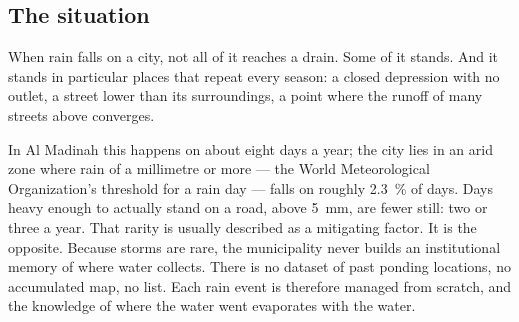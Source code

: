 \documentclass[11pt,a4paper]{article}
\begin{document}
\subsection{The situation}
When rain falls on a city, not all of it reaches a drain. Some of it stands. And it
stands in particular places that repeat every season: a closed depression with no
outlet, a street lower than its surroundings, a point where the runoff of many streets
above converges.

In Al Madinah this happens on about eight days a year; the city lies in an arid zone
where rain of a millimetre or more --- the World Meteorological Organization's threshold
for a rain day --- falls on roughly \SI{2.3}{\percent} of days. Days heavy enough to
actually stand on a road, above \SI{5}{\milli\metre}, are fewer still: two or three a
year. That rarity is usually described as a mitigating factor. It is the opposite. Because storms are rare, the municipality
never builds an institutional memory of where water collects. There is no dataset of
past ponding locations, no accumulated map, no list. Each rain event is therefore
managed from scratch, and the knowledge of where the water went evaporates with the
water.
\end{document}
